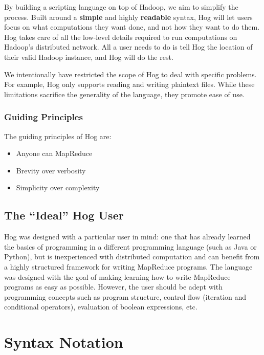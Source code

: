 \documentclass{book}
\begin{document}
By building a scripting language on top of Hadoop, we aim to simplify the process.
Built around a \textbf{simple} and highly \textbf{readable} syntax, Hog will let
users focus on what computations they want done, and not how they want to do them.
Hog takes care of all the low-level details required to run computations on
Hadoop’s distributed network. All a user needs to do is tell Hog the location of
their valid Hadoop instance, and Hog will do the rest.

We intentionally have restricted the scope of Hog to deal with specific
problems.  For example, Hog only supports reading and writing plaintext files.
While these limitations sacrifice the generality of the language, they promote
ease of use.

\subsubsection{Guiding Principles} %
\label{ssub:guiding_principles}

The guiding principles of Hog are:

\begin{itemize}
  \item Anyone can MapReduce
  \item Brevity over verbosity
  \item Simplicity over complexity
\end{itemize}



\subsection{The ``Ideal'' Hog User} %
\label{sub:the_ideal_hog_user}

Hog was designed with a particular user in mind: one that has already learned
the basics of programming in a different programming language (such as Java or
Python), but is inexperienced with distributed computation and can benefit from
a highly structured framework for writing MapReduce programs. The language was
designed with the goal of making learning how to write MapReduce programs as
easy as possible. However, the user should be adept with programming concepts
such as program structure, control flow (iteration and conditional operators),
evaluation of boolean expressions, etc.



\section{Syntax Notation} %
\label{sec:syntax_notation}
\end{document}
